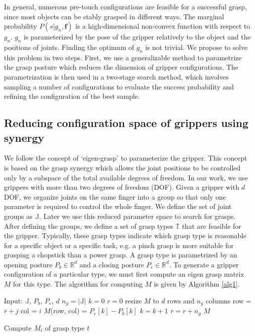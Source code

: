 In general, numerous pre-touch configurations are feasible for a successful grasp, since most objects can be stably grasped in different ways. The marginal probability $P(s|g_n,\bm{f})$ is a high-dimensional non-convex function with respect to $g_n$. $g_n$ is parameterized by the pose of the gripper relatively to the object and the positions of joints. Finding the optimum of $g_n$ is not trivial. We propose to solve this problem in two steps. First, we use a generalizable method to parametrize the grasp posture which reduces the dimension of gripper configurations. The parametrization is then used in a two-stage search method, which involves sampling a number of configurations to evaluate the success probability and refining the configuration of the best sample.    

\subsection{Reducing configuration space of grippers using synergy }

We follow the concept of `eigen-grasp'\cite{Ciocarlie2009} to parameterize the gripper. This concept is based on the grasp synergy which allows the joint positions to be controlled only by a subspace of the total available degrees of freedom. In our work, we use grippers with more than two degrees of freedom (DOF). Given a gripper with $d$ DOF, we organize joints on the same finger into a group so that only one parameter is required to control the whole finger. We define the set of joint groups as $\mathbb{J}$. Later we use this reduced parameter space to search for grasps. After defining the groups, we define a set of grasp types $\mathbb{T}$ that are feasible for the gripper. Typically, these grasp types indicate which grasp type is reasonable for a specific object or a specific task, e.g. a pinch grasp is more suitable for grasping a chopstick than a power grasp. A grasp type is parametrized by an opening posture $P_b \in\mathbb{R}^d$  and a closing posture $P_e \in\mathbb{R}^d$. To generate a gripper configuration of a particular type, we must first compute an eigen grasp matrix  $M$ for this type. The algorithm for computing $M$ is given by Algorithm \ref{alg1}. 

\begin{algorithm}
\begin{algorithmic}[1]
\STATE Input:  $\mathbb{J}$, $P_b$, $P_e$, $d$   
\STATE $n_g  =  |\mathbb{J}| $
\STATE $k = 0$ %
\STATE $r = 0$ %
\STATE resize $M$ to $d$ rows and $n_g$ columns  
\STATE row = $r + j$ 
\STATE col = $i$   
\STATE $M$(row, col) = $P_e[k] - P_b[k]$
\STATE $k = k + 1$
\ENDFOR
\STATE $r = r + n_g$
\ENDFOR
\RETURN $M$
\caption {Compute $M_t$ of grasp type $t$}
\label{alg1}
\end{algorithmic}
\end{algorithm}

